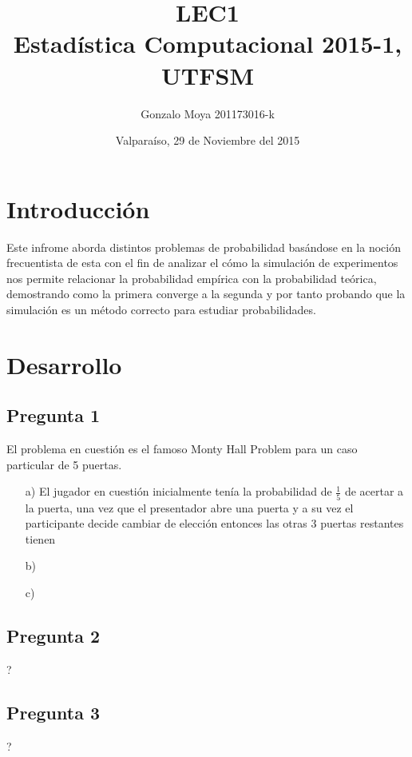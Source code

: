 \documentclass[letter,10pt]{article}
\title{LEC1 \\ Estadística Computacional 2015-1, UTFSM }
\author{Gonzalo Moya 201173016-k}
\date{\vspace*{1cm} Valparaíso, 29 de Noviembre del 2015}
\begin{document}
\maketitle
\thispagestyle{empty}
\newpage
\tableofcontents

\makeatother

\newpage

\section{Introducción}

Este infrome aborda distintos problemas de probabilidad basándose en la noción frecuentista de esta con el fin de analizar
el cómo la simulación de experimentos nos permite relacionar la probabilidad empírica con la probabilidad teórica, demostrando como la
primera converge a la segunda y por tanto probando que la simulación es un método correcto para estudiar probabilidades.


\section{Desarrollo}
\subsection{Pregunta 1}
El problema en cuestión es el famoso Monty Hall Problem para un caso particular de 5 puertas.
\begin{itemize}
 \item[a)] El jugador en cuestión inicialmente tenía la probabilidad de $\frac{1}{5}$ de acertar a la puerta, una vez que el presentador
 abre una puerta y a su vez el participante decide cambiar de elección entonces las otras 3 puertas restantes tienen 
 \item[b)]
 \item[c)]
\end{itemize}

\subsection{Pregunta 2}
?
\subsection{Pregunta 3}
?
\end{document}
